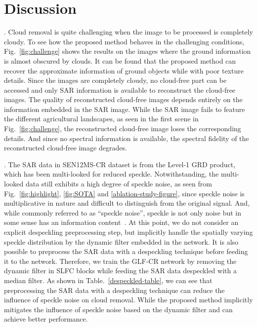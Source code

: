 \documentclass[a4paper,fleqn]{cas-dc}
\begin{document}
\section{Discussion}
.
Cloud removal is quite challenging when the image to be processed is completely cloudy. To see how the proposed method behaves in the challenging conditions, Fig.~\ref{fig:challenge} shows the results on the images where the ground information is almost obscured by clouds. It can be found that the proposed method can recover the approximate information of ground objects while with poor texture details. Since the images are completely cloudy, no cloud-free part can be accessed and only SAR information is available to reconstruct the cloud-free images. The quality of reconstructed cloud-free images depends entirely on the information embedded in the SAR image. While the SAR image fails to feature the different agricultural landscapes, as seen in the first scene in Fig.~\ref{fig:challenge}, the reconstructed cloud-free image loses the corresponding details. And since no spectral information is available, the spectral fidelity of the  reconstructed cloud-free image degrades.

.
The SAR data in SEN12MS-CR dataset is from the Level-1 GRD product, which has been multi-looked for reduced speckle. Notwithstanding, the multi-looked data still exhibits a high degree of speckle noise, as seen from Fig.~\ref{fig:highlight}, \ref{fig:SOTA} and \ref{ablation-study-figure}, since speckle noise is multiplicative in nature and difficult to distinguish from the original signal. And, while commonly referred to as ``speckle noise'', speckle is not only noise but in some sense has an information content~\citep{argenti2013tutorial}. At this point, we do not consider an explicit despeckling preprocessing step, but implicitly handle the spatially varying speckle distribution by the dynamic filter embedded in the network. It is also possible to preprocess the SAR data with a despeckling technique before feeding it to the network. Therefore, we train the GLF-CR network by removing the dynamic filter in SLFC blocks while feeding the SAR data despeckled with a median filter. As shown in Table.~\ref{despeckled-table}, we can see that preprocessing the SAR data with a despeckling technique can reduce the influence of speckle noise on cloud removal. While the proposed method implicitly mitigates the influence of speckle noise based on the dynamic filter and can achieve better performance.  
\end{document}
